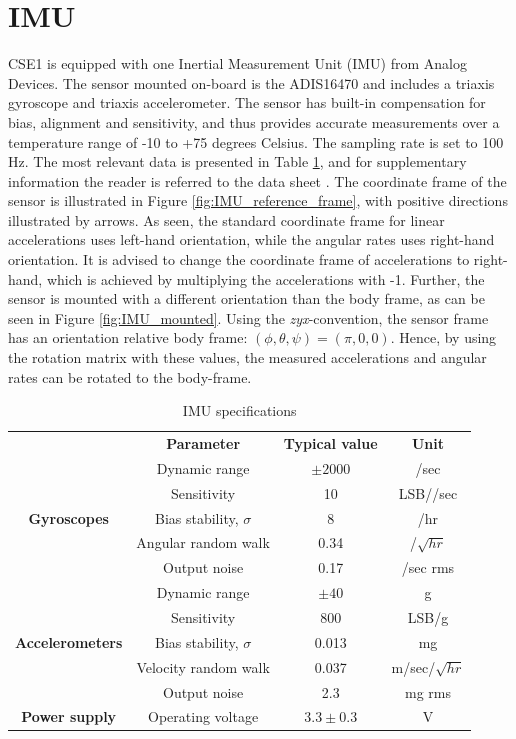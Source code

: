 \section{IMU}
CSE1 is equipped with one Inertial Measurement Unit (IMU) from Analog Devices. The sensor mounted on-board is the ADIS16470 and includes a triaxis gyroscope and triaxis accelerometer. The sensor has built-in compensation for bias, alignment and sensitivity, and thus provides accurate measurements over a temperature range of -10 to +75 degrees Celsius. The sampling rate is set to 100 Hz. The most relevant data is presented in Table \ref{tab:IMU_specifications}, and for supplementary information the reader is referred to the data sheet \cite{adis16470}. The coordinate frame of the sensor is illustrated in Figure \ref{fig:IMU_reference_frame}, with positive directions illustrated by arrows. As seen, the standard coordinate frame for linear accelerations uses left-hand orientation, while the angular rates uses right-hand orientation. It is advised to change the coordinate frame of accelerations to right-hand, which is achieved by multiplying the accelerations with -1. Further, the sensor is mounted with a different orientation than the body frame, as can be seen in Figure \ref{fig:IMU_mounted}. Using the \textit{zyx}-convention, the sensor frame has an orientation relative body frame: $(\phi, \theta, \psi) = (\pi, 0, 0)$. Hence, by using the rotation matrix with these values, the measured accelerations and angular rates can be rotated to the body-frame. 
\begin{table}[htb!]\caption{IMU specifications}\label{tab:IMU_specifications}
	\centering
	\begin{tabular}{c|c|c|c|}
		\cline{2-4}
		& \textbf{Parameter} & \textbf{Typical value} & \textbf{Unit}\\ \cline{1-4}
		\multicolumn{1}{|c|}{\multirow{5}{*}{\textbf{Gyroscopes}}} & Dynamic range & $\pm 2000$ & \degree/sec\\ 
		\multicolumn{1}{|c|}{} & Sensitivity & 10 & LSB/\degree/sec\\ 
		\multicolumn{1}{|c|}{} & Bias stability, $\sigma$ & 8 & \degree/hr\\ 
		\multicolumn{1}{|c|}{} & Angular random walk & 0.34 & \degree/$\sqrt{hr}$\\ 
		\multicolumn{1}{|c|}{} & Output noise & 0.17 & \degree/sec rms\\ \cline{1-4}
		
		\multicolumn{1}{|c|}{\multirow{5}{*}{\textbf{Accelerometers}}} & Dynamic range & $\pm 40$ & g\\ 
		\multicolumn{1}{|c|}{} & Sensitivity & 800 & LSB/g\\ 
		\multicolumn{1}{|c|}{} & Bias stability, $\sigma$ & 0.013 & mg\\ 
		\multicolumn{1}{|c|}{} & Velocity random walk & 0.037 & m/sec/$\sqrt{hr}$\\ 
		\multicolumn{1}{|c|}{} & Output noise & 2.3 & mg rms\\ \cline{1-4}
		
		\multicolumn{1}{|c|}{\multirow{1}{*}{\textbf{Power supply}}} & Operating voltage& $3.3 \pm 0.3$ & V\\ \cline{1-4}
	\end{tabular}
\end{table}
